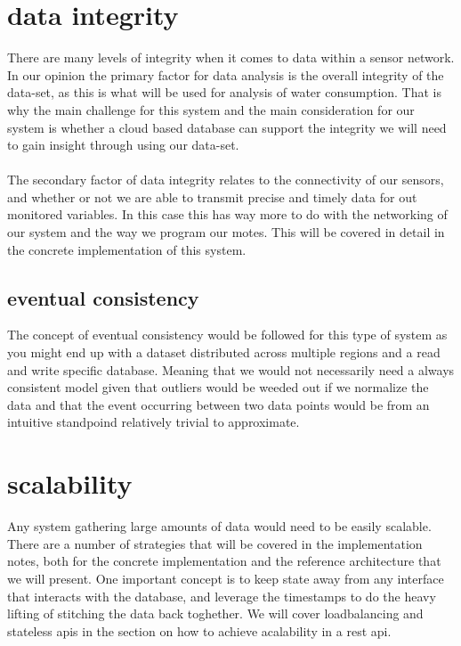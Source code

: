 \documentclass[]{uiophd}
\begin{document}
\section{data integrity}
There are many levels of integrity when it comes to data within a sensor network. In our opinion the primary factor for data analysis is the overall integrity of the data-set, as this is what will be used for analysis of water consumption. That is why the main challenge for this system and the main consideration for our system is whether a cloud based database can support the integrity we will need to gain insight through using our data-set. 
\\\\
The secondary factor of data integrity relates to the connectivity of our sensors, and whether or not we are able to transmit precise and timely data for out monitored variables. In this case this has way more to do with the networking of our system and the way we program our motes. This will be covered in detail in the concrete implementation of this system.
\subsection{eventual consistency}
The concept of eventual consistency would be followed for this type of system as you might end up with a dataset distributed across multiple regions and a read and write specific database. Meaning that we would not necessarily need a always consistent model given that outliers would be weeded out if we normalize the data and that the event occurring between two data points would be from an intuitive standpoind relatively trivial to approximate.
\section{scalability}
Any system gathering large amounts of data would need to be easily scalable. There are a number of strategies that will be covered in the implementation notes, both for the concrete implementation and the reference architecture that we will present. One important concept is to keep state away from any interface that interacts with the database, and leverage the timestamps to do the heavy lifting of stitching the data back toghether. We will cover loadbalancing and stateless apis in the section on how to achieve acalability in a rest api.
\end{document}
